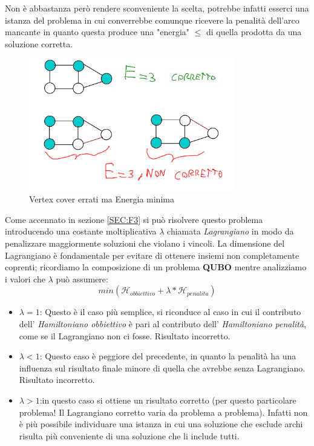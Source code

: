 \documentclass[a4paper]{article}
\begin{document}
Non è abbastanza però rendere sconveniente la scelta, potrebbe infatti esserci una istanza del problema in cui converrebbe comunque ricevere la penalità dell'arco mancante in quanto questa produce una "energia" $\leq$ di quella prodotta da una soluzione corretta.\\
\newpage
\begin{figure}[!ht]
\centering
\includegraphics[width = 0.8\textwidth]{./img/F4_errato.png}
\caption{Vertex cover errati ma Energia minima} \label{FIG:F4_errato}
\end{figure}
Come accennato in sezione \ref{SEC:F3} si può risolvere questo problema introducendo una costante moltiplicativa $\lambda$ chiamata \textit{Lagrangiano} in modo da penalizzare maggiormente soluzioni che violano i vincoli.
La dimensione del Lagrangiano è fondamentale per evitare di ottenere insiemi non completamente coprenti; ricordiamo la composizione di un problema \textbf{QUBO} mentre analizziamo i valori che $\lambda$ può assumere:
$$ min(\mathcal{H}_{obbiettivo} + \lambda * \mathcal{H}_{penalita})$$
\begin{itemize}
	\item $\lambda = 1$: Questo è il caso più semplice, si riconduce al caso in cui il contributo dell' \textit{Hamiltoniano obbiettivo} è pari al contributo dell' \textit{Hamiltoniano penalità}, come se il Lagrangiano non ci fosse. Risultato incorretto.
	\item $\lambda < 1$: Questo caso è peggiore del precedente, in quanto la penalità ha una influenza sul risultato finale minore di quella che avrebbe senza Lagrangiano. Risultato incorretto.
	\item $\lambda > 1$:in questo caso si ottiene un risultato corretto (per questo particolare problema! Il Lagrangiano corretto varia da problema a problema). Infatti non è più possibile individuare una istanza in cui una soluzione che esclude archi risulta più conveniente di una soluzione che li include tutti.
\end{itemize}
\newpage
\end{document}
